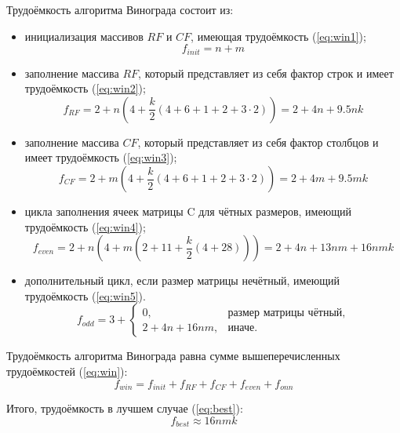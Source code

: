 Трудоёмкость алгоритма Винограда состоит из:
\begin{itemize}
    \item инициализация массивов $RF$ и $CF$, имеющая трудоёмкость (\ref{eq:win1});
        \begin{equation}
            \label{eq:win1}
            f_{init} = n + m
        \end{equation}
	\item заполнение массива $RF$, который представляет из себя фактор строк и имеет трудоёмкость (\ref{eq:win2});
        \begin{equation}
            \label{eq:win2}
            f_{RF} = 2 + n(4 + \frac{k}{2}(4 + 6 + 1 + 2 + 3 \cdot 2)) = 2 + 4n + 9.5nk
        \end{equation}
	\item заполнение массива $CF$, который представляет из себя фактор столбцов и имеет трудоёмкость (\ref{eq:win3});
        \begin{equation}
            \label{eq:win3}
            f_{CF} = 2 + m(4 + \frac{k}{2}(4 + 6 + 1 + 2 + 3 \cdot 2)) = 2 + 4m + 9.5mk
        \end{equation}
	\item цикла заполнения ячеек матрицы C для чётных размеров, имеющий трудоёмкость (\ref{eq:win4});
        \begin{equation}
            \label{eq:win4}
            f_{even} = 2 + n(4 + m(2 + 11 + \frac{k}{2}(4 + 28))) = 2 + 4n + 13nm + 16nmk
        \end{equation}
    \item дополнительный цикл, если размер матрицы нечётный, имеющий трудоёмкость (\ref{eq:win5}).
        \begin{equation}
            \label{eq:win5}
            f_{odd} = 3 +
            \begin{cases}
            0, & \text{размер матрицы чётный,}\\
            2 + 4n + 16nm, & \text{иначе.}
            \end{cases}
        \end{equation}
\end{itemize}

Трудоёмкость алгоритма Винограда равна сумме вышеперечисленных трудоёмкостей (\ref{eq:win}):
\begin{equation}
    \label{eq:win}
    f_{win} = f_{init} + f_{RF} + f_{CF} + f_{even} + f_{onn}
\end{equation}

Итого, трудоёмкость в лучшем случае (\ref{eq:best}):
\begin{equation}
    \label{eq:best}
    f_{best} \approx 16nmk
\end{equation}

